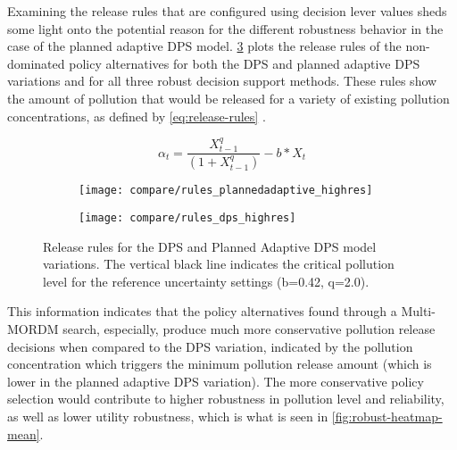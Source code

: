     Examining the release rules that are configured using decision lever values sheds some light onto the potential reason for the different robustness behavior in the case of the planned adaptive DPS model. \cref{fig:release-rules} plots the release rules of the non-dominated policy alternatives for both the DPS and planned adaptive DPS variations and for all three robust decision support methods. These rules show the amount of pollution that would be released for a variety of existing pollution concentrations, as defined by \cref{eq:release-rules} \citep{Quinn2017}. 
    
    \begin{equation}\label{eq:release-rules}
        \alpha_{t} = \frac{X_{t-1}^{q}}{(1+X_{t-1}^{q})} - b*X_{t}
    \end{equation}
    
    \begin{figure}[ht]
        \centering
        \captionsetup{width=\textwidth}
        
        \begin{subfigure}[b]{\textwidth}
            \texttt{[image: compare/rules\_plannedadaptive\_highres]}
            \label{fig:planned-releaserules}
        \end{subfigure}
    
        \begin{subfigure}[b]{\textwidth}
            \texttt{[image: compare/rules\_dps\_highres]}
            \label{fig:dps-releaserules}
        \end{subfigure}
        
        \caption[Release rules for DPS and planned adaptive DPS variatons]{Release rules for the DPS and Planned Adaptive DPS model variations. The vertical black line indicates the critical pollution level for the reference uncertainty settings (b=0.42, q=2.0).}
        \label{fig:release-rules}
    \end{figure}

    This information indicates that the policy alternatives found through a Multi-MORDM search, especially, produce much more conservative pollution release decisions when compared to the DPS variation, indicated by the pollution concentration which triggers the minimum pollution release amount (which is lower in the planned adaptive DPS variation). The more conservative policy selection would contribute to higher robustness in pollution level and reliability, as well as lower utility robustness, which is what is seen in \cref{fig:robust-heatmap-mean}. 
    
